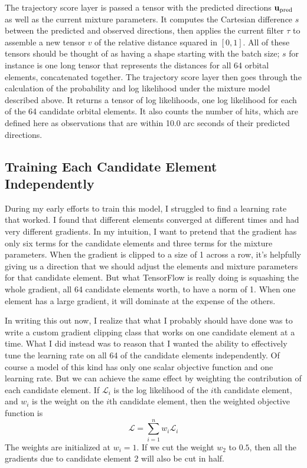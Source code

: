 The trajectory score layer is passed a tensor with the predicted directions $\mathbf{u}_{\mathrm{pred}}$ as well as the current mixture parameters.
It computes the Cartesian difference $s$ between the predicted and observed directions, 
then applies the current filter $\tau$ to assemble a new tensor $v$ of the relative distance squared in $[0,1]$.
All of these tensors should be thought of as having a shape starting with the batch size;
$s$ for instance is one long tensor that represents the distances for all 64 orbital elements, concatenated together.
The trajectory score layer then goes through the calculation of the probability and log likelihood under the mixture model described above.
It returns a tensor of log likelihoods, one log likelihood for each of the 64 candidate orbital elements.
It also counts the number of hits, which are defined here as observations that are within 10.0 arc seconds of their predicted directions.

\subsection{Training Each Candidate Element Independently}
During my early efforts to train this model, I struggled to find a learning rate that worked.
I found that different elements converged at different times and had very different gradients.
In my intuition, I want to pretend that the gradient has only six terms for the candidate elements and three terms for the mixture parameters.
When the gradient is clipped to a size of 1 across a row, 
it's helpfully giving us a direction that we should adjust the elements and mixture parameters for that candidate element.
But what TensorFlow is really doing is squashing the whole gradient, all 64 candidate elements worth, to have a norm of 1.
When one element has a large gradient, it will dominate at the expense of the others.

In writing this out now, I realize that what I probably should have done was to write a custom gradient clipping class that works on one candidate element at a time.
What I did instead was to reason that I wanted the ability to effectively tune the learning rate on all 64 of the candidate elements independently.
Of course a model of this kind has only one scalar objective function and one learning rate.
But we can achieve the same effect by weighting the contribution of each candidate element.
If $\mathcal{L}_i$ is the log likelihood of the $i$th candidate element, and $w_i$ is the weight on the $i$th candidate element,  
then the weighted objective function is 
$$\mathcal{L} = \sum_{i=1}^{n} w_i \mathcal{L}_i$$
The weights are initialized at $w_i=1$.  If we cut the weight $w_2$ to $0.5$, then all the gradients due to candidate element $2$ will also be cut in half.

